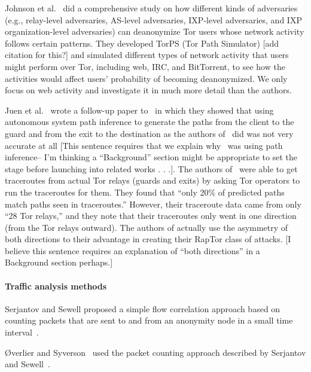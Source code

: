 Johnson et al.~\cite{Johnson2013a} did a comprehensive study on how 
different kinds of adversaries (e.g., relay-level adversaries, AS-level adversaries, 
IXP-level adversaries, and IXP organization-level adversaries) can deanonymize Tor 
users whose network activity follows certain patterns. They developed TorPS (Tor Path Simulator) 
[add citation for this?] and simulated different types of network activity that users 
might perform over Tor, including web, IRC, and BitTorrent, to see how the activities 
would affect users' probability of becoming deanonymized. We only focus on web 
activity and investigate it in much more detail than the authors.

Juen et al.~\cite{Juen2015a} wrote a follow-up paper to~\cite{Johnson2013a} 
in which they showed that using autonomous system path inference to generate 
the paths from the client to the guard and from the exit to the destination 
as the authors of~\cite{Johnson2013a} did was not very accurate at all 
[This sentence requires that we explain why~\cite{Johnson2013a} was using path inference--
I'm thinking a ``Background'' section might be appropriate to set the stage 
before launching into related works . . .]. The authors of~\cite{Juen2015a} 
were able to get traceroutes from actual Tor relays (guards and exits) by asking 
Tor operators to run the traceroutes for them. They found that ``only 20\% of predicted paths 
match paths seen in traceroutes.'' However, their traceroute data came from 
only ``28 Tor relays,'' and they note that their traceroutes only went 
in one direction (from the Tor relays outward). The authors of \cite{sun2015raptor} 
actually use the asymmetry of both directions to their advantage in creating their 
RapTor class of attacks. 
[I believe this sentence requires an explanation of ``both directions'' in a Background section perhaps.]

\paragraph{Traffic analysis methods}
Serjantov and Sewell proposed a simple flow correlation approach based on
counting packets that are sent to and from an anonymity node in a small time
interval~\cite{Serjantov2003a}.

\O{}verlier and Syverson~\cite{Overlier2006a} used the packet counting approach
described by Serjantov and Sewell~\cite{Serjantov2003a}.

\cite{Goldberg2010a}

\cite{Juen2015a}

